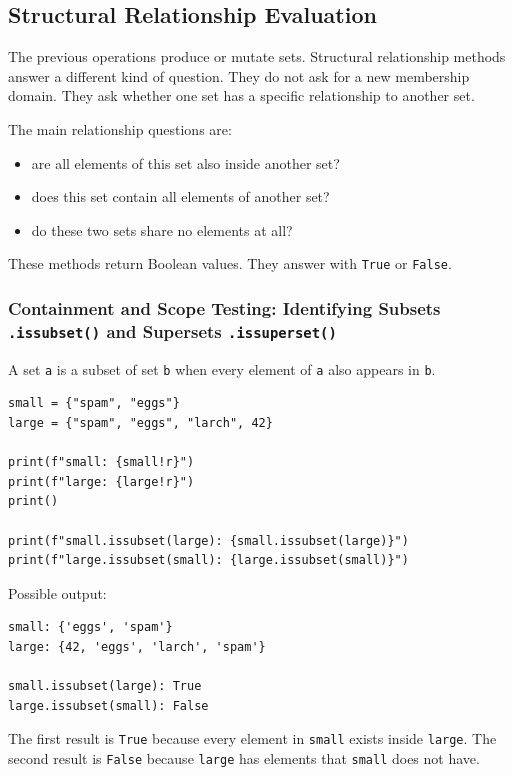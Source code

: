 \subsection{Structural Relationship Evaluation}

The previous operations produce or mutate sets. Structural relationship methods answer a different kind of question. They do not ask for a new membership domain. They ask whether one set has a specific relationship to another set.

The main relationship questions are:

\begin{itemize}
    \item are all elements of this set also inside another set?
    \item does this set contain all elements of another set?
    \item do these two sets share no elements at all?
\end{itemize}

These methods return Boolean values. They answer with \texttt{True} or \texttt{False}.

\subsubsection{Containment and Scope Testing: Identifying Subsets \texttt{.issubset()} and Supersets \texttt{.issuperset()}}

A set \texttt{a} is a subset of set \texttt{b} when every element of \texttt{a} also appears in \texttt{b}.

\begin{verbatim}
small = {"spam", "eggs"}
large = {"spam", "eggs", "larch", 42}

print(f"small: {small!r}")
print(f"large: {large!r}")
print()

print(f"small.issubset(large): {small.issubset(large)}")
print(f"large.issubset(small): {large.issubset(small)}")
\end{verbatim}

Possible output:

\begin{verbatim}
small: {'eggs', 'spam'}
large: {42, 'eggs', 'larch', 'spam'}

small.issubset(large): True
large.issubset(small): False
\end{verbatim}

The first result is \texttt{True} because every element in \texttt{small} exists inside \texttt{large}. The second result is \texttt{False} because \texttt{large} has elements that \texttt{small} does not have.

